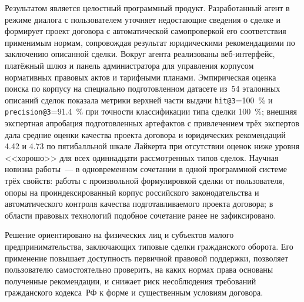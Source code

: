 Результатом является целостный программный продукт. Разработанный агент в режиме диалога с пользователем уточняет недостающие сведения о сделке и формирует проект договора с автоматической самопроверкой его соответствия применимым нормам, сопровождая результат юридическими рекомендациями по заключению описанной сделки. Вокруг агента реализованы веб-интерфейс, платёжный шлюз и панель администратора для управления корпусом нормативных правовых актов и тарифными планами. Эмпирическая оценка поиска по корпусу на специально подготовленном датасете из~54 эталонных описаний сделок показала метрики верхней части выдачи \texttt{hit@3}=100~\% и \texttt{precision@3}=91.4~\% при точности классификации типа сделки 100~\%; внешняя экспертная апробация подготовленных артефактов с привлечением трёх экспертов дала средние оценки качества проекта договора и юридических рекомендаций 4.42 и 4.73 по пятибалльной шкале Лайкерта при отсутствии оценок ниже уровня <<хорошо>> для всех одиннадцати рассмотренных типов сделок. Научная новизна работы~--- в одновременном сочетании в одной программной системе трёх свойств: работы с произвольной формулировкой сделки от пользователя, опоры на проиндексированный корпус российского законодательства и автоматического контроля качества подготавливаемого проекта договора; в области правовых технологий подобное сочетание ранее не зафиксировано.

Решение ориентировано на физических лиц и субъектов малого предпринимательства, заключающих типовые сделки гражданского оборота. Его применение повышает доступность первичной правовой поддержки, позволяет пользователю самостоятельно проверить, на каких нормах права основаны полученные рекомендации, и снижает риск несоблюдения требований гражданского кодекса~РФ к форме и существенным условиям договора.

